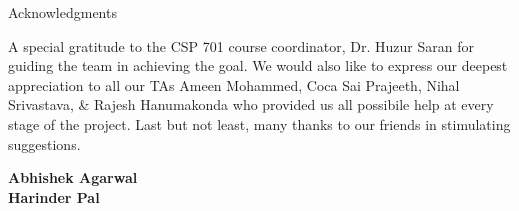 \begin{center}
\LARGE{Acknowledgments} 
\end{center}

\vspace{0.5in}

A special gratitude to the CSP 701 course coordinator, Dr. Huzur Saran for guiding the team in achieving the goal. We would also like to express our deepest appreciation to all our TAs Ameen Mohammed, Coca Sai Prajeeth, Nihal Srivastava, \& Rajesh Hanumakonda who provided us all possibile help at every stage of the project. Last but not least, many thanks to our friends in stimulating suggestions.
\vspace{1.5in}

{\bfseries Abhishek Agarwal \\ Harinder Pal}
